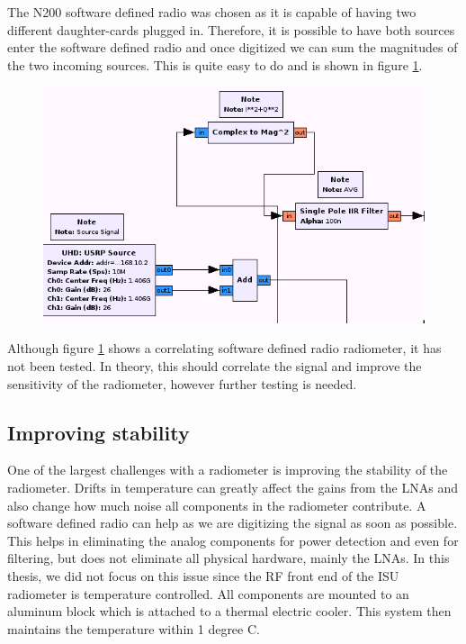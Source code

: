 The N200 software defined radio was chosen as it is capable of having two different daughter-cards plugged in.  Therefore, it is possible to have both sources enter the software defined radio and once digitized we can sum the magnitudes of the two incoming sources.  This is quite easy to do and is shown in figure \ref{correlating_sdr}.

{\begin{figure}[h!tb] 
\centering
\includegraphics[width=14cm]{Images/N200_rad_corr.png}
\label{correlating_sdr}
\end{figure}
}

Although figure \ref{correlating_sdr} shows a correlating software defined radio radiometer, it has not been tested.  In theory, this should correlate the signal and improve the sensitivity of the radiometer, however further testing is needed.

\subsection{Improving stability}

One of the largest challenges with a radiometer is improving the stability of the radiometer.  Drifts in temperature can greatly affect the gains from the LNAs and also change how much noise all components in the radiometer contribute.  A software defined radio can help as we are digitizing the signal as soon as possible.  This helps in eliminating the analog components for power detection and even for filtering, but does not eliminate all physical hardware, mainly the LNAs.  In this thesis, we did not focus on this issue since the RF front end of the ISU radiometer is temperature controlled.  All components are mounted to an aluminum block which is attached to a thermal electric cooler.  This system then maintains the temperature within 1 degree C.  

